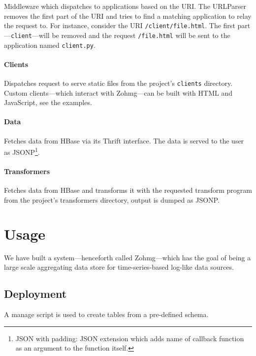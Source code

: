 \documentclass[a4paper,10pt]{book}
\begin{document}
Middleware which dispatches to applications based on the URI. The URLParser
removes the first part of the URI and tries to find a matching application
to relay the request to. For instance, consider the URI
\texttt{/client/file.html}. The first part---\texttt{client}---will be
removed and the request \texttt{/file.html} will be sent to the application
named \texttt{client.py}.


\subsubsection{Clients}

Dispatches request to serve static files from the project's
\texttt{clients} directory. Custom clients---which interact with Zohmg---can
be built with HTML and JavaScript, see the examples.


\subsubsection{Data}

Fetches data from HBase via its Thrift interface. The data is served to the
user as JSONP\footnote{JSON with padding: JSON extension which adds name of
callback function as an argument to the function itself.}.


\subsubsection{Transformers}

Fetches data from HBase and transforms it with the requested transform
program from the project's transformers directory, output is
dumped as JSONP.



\chapter{Usage}

We have built a system---henceforth called Zohmg---which has the goal of being
a large scale aggregating data store for time-series-based log-like
data sources.



\section{Deployment}

A manage script is used to create tables from a pre-defined schema.
\end{document}
